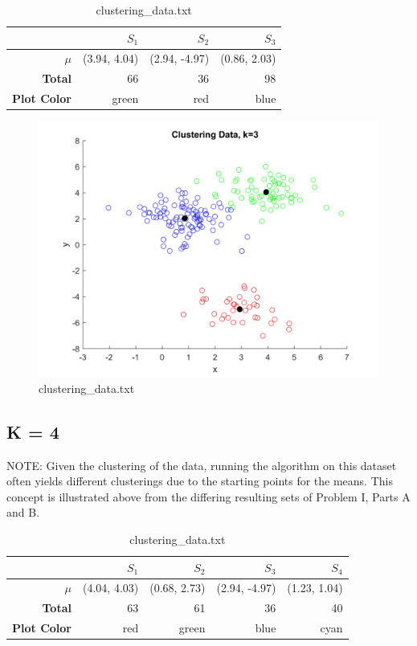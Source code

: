 \documentclass[12pt, letterpaper]{report}
\begin{document}
\begin{table}[H]
	\centering
	\begin{tabular}{ |r|r|r|r| }
		\hline
		& \textbf{$S_1$} & \textbf{$S_2$} & \textbf{$S_3$} \\
		\hline
		\textbf{$\mu$} & (3.94, 4.04) & (2.94, -4.97) & (0.86, 2.03) \\
		\hline
		\textbf{Total} & 66 & 36 & 98 \\
		\hline
		\textbf{Plot Color} & green & red & blue \\
		\hline
	\end{tabular}
	\caption{clustering\_data.txt}
\end{table}


\begin{figure}[H]
	\centering
	\includegraphics[width=0.7\columnwidth]{cluster_k3.png}
	\caption{clustering\_data.txt}
\end{figure}

\pagebreak
\subsection{K = 4}

NOTE: Given the clustering of the data, running the algorithm on this dataset often yields different clusterings due to the starting points for the means. This concept is illustrated above from the differing resulting sets of Problem I, Parts A and B.
\\
\begin{table}[H]
	\centering
	\begin{tabular}{ |r|r|r|r|r| }
		\hline
		& \textbf{$S_1$} & \textbf{$S_2$} & \textbf{$S_3$} & \textbf{$S_4$} \\
		\hline
		\textbf{$\mu$} & (4.04, 4.03) & (0.68, 2.73) & (2.94, -4.97) & (1.23, 1.04) \\
		\hline
		\textbf{Total} & 63 & 61 & 36 & 40  \\
		\hline
		\textbf{Plot Color} & red & green & blue & cyan \\
		\hline
	\end{tabular}
	\caption{clustering\_data.txt}
\end{table}
\end{document}
